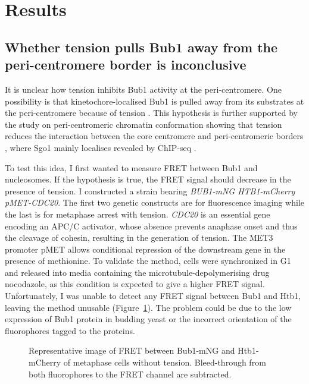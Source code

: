 \section{Results}
\subsection{Whether tension pulls Bub1 away from the peri-centromere border is inconclusive}

It is unclear how tension inhibits Bub1 activity at the peri-centromere. One possibility is that kinetochore-localised Bub1 is pulled away from its substrates at the peri-centromere because of tension \citep{Nerusheva2014}. This hypothesis is further supported by the study on peri-centromeric chromatin conformation showing that tension reduces the interaction between the core centromere and peri-centromeric borders \citep{Paldi2020ConvergentPericentromeres}, where Sgo1 mainly localises revealed by ChIP-seq \citep{Verzijlbergen2014, Deng2018}. 

To test this idea, I first wanted to measure FRET between Bub1 and nucleosomes. If the hypothesis is true, the FRET signal should decrease in the presence of tension. I constructed a strain bearing \textit{BUB1-mNG HTB1-mCherry pMET-CDC20}. The first two genetic constructs are for fluorescence imaging while the last is for metaphase arrest with tension. \textit{CDC20} is an essential gene encoding an APC/C activator, whose absence prevents anaphase onset and thus the cleavage of cohesin, resulting in the generation of tension. The MET3 promoter pMET allows conditional repression of the downstream gene in the presence of methionine. To validate the method, cells were synchronized in G1 and released into media containing the microtubule-depolymerising drug nocodazole, as this condition is expected to give a higher FRET signal. Unfortunately, I was unable to detect any FRET signal between Bub1 and Htb1, leaving the method unusable (Figure~\ref{fig:FRET}). The problem could be due to the low expression of Bub1 protein in budding yeast or the incorrect orientation of the fluorophores tagged to the proteins. 


\begin{figure}[htbp]
  \centering
  
  \caption[Representative image of FRET between Bub1-mNG and Htb1-mCherry of metaphase cells without tension]{Representative image of FRET between Bub1-mNG and Htb1-mCherry of metaphase cells without tension. Bleed-through from both fluorophores to the FRET channel are subtracted. }
  \label{fig:FRET}
\end{figure} 

